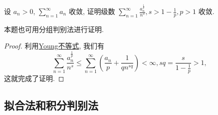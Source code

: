 \documentclass[../../main.tex]{subfiles}%
\begin{document}
\begin{example}
设 $a_n > 0$, $\sum_{n=1}^{\infty} a_n$ 收敛, 证明级数 $\sum_{n=1}^{\infty} \frac{a_n^{\frac{1}{p}}}{n^s}, s > 1 - \frac{1}{p}, p > 1$ 收敛.
\end{example}
\begin{remark}
本题也可用分组判别法进行证明.
\end{remark}
\begin{proof}
利用\hyperref[theorem:Young不等式]{Young不等式}, 我们有
\[
\sum_{n=1}^{\infty} \frac{a_n^{\frac{1}{p}}}{n^s} \leqslant \sum_{n=1}^{\infty} \left( \frac{a_n}{p} + \frac{1}{q n^{s q}} \right) < \infty, s q = \frac{s}{1 - \frac{1}{p}} > 1,
\]
这就完成了证明.
\end{proof}


\subsection{拟合法和积分判别法}
\end{document}
